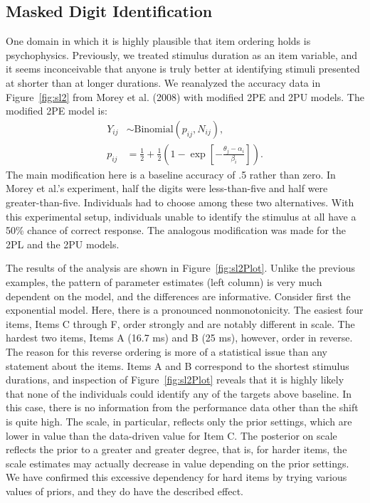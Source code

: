 \documentclass[english,,man]{apa6}
\begin{document}
\hypertarget{masked-digit-identification}{%
\subsection{Masked Digit Identification}\label{masked-digit-identification}}

One domain in which it is highly plausible that item ordering holds is psychophysics. Previously, we treated stimulus duration as an item variable, and it seems inconceivable that anyone is truly better at identifying stimuli presented at shorter than at longer durations. We reanalyzed the accuracy data in Figure~\ref{fig:sl2} from Morey et al. (2008) with modified 2PE and 2PU models. The modified 2PE model is:
\[
\begin{aligned}
Y_{ij} &\sim \mbox{Binomial}(p_{ij},N_{ij}),\\
p_{ij} &= \frac{1}{2}+\frac{1}{2}\left(1-\exp\left[-\frac{\theta_j-\alpha_i}{\beta_i}\right]\right).
\end{aligned}
\]
The main modification here is a baseline accuracy of .5 rather than zero. In Morey et al.'s experiment, half the digits were less-than-five and half were greater-than-five. Individuals had to choose among these two alternatives. With this experimental setup, individuals unable to identify the stimulus at all have a 50\% chance of correct response. The analogous modification was made for the 2PL and the 2PU models.

The results of the analysis are shown in Figure~\ref{fig:sl2Plot}. Unlike the previous examples, the pattern of parameter estimates (left column) is very much dependent on the model, and the differences are informative. Consider first the exponential model. Here, there is a pronounced nonmonotonicity. The easiest four items, Items C through F, order strongly and are notably different in scale. The hardest two items, Items A (16.7 ms) and B (25 ms), however, order in reverse. The reason for this reverse ordering is more of a statistical issue than any statement about the items. Items A and B correspond to the shortest stimulus durations, and inspection of Figure~\ref{fig:sl2Plot} reveals that it is highly likely that none of the individuals could identify any of the targets above baseline. In this case, there is no information from the performance data other than the shift is quite high. The scale, in particular, reflects only the prior settings, which are lower in value than the data-driven value for Item C. The posterior on scale reflects the prior to a greater and greater degree, that is, for harder items, the scale estimates may actually decrease in value depending on the prior settings. We have confirmed this excessive dependency for hard items by trying various values of priors, and they do have the described effect.
\end{document}
